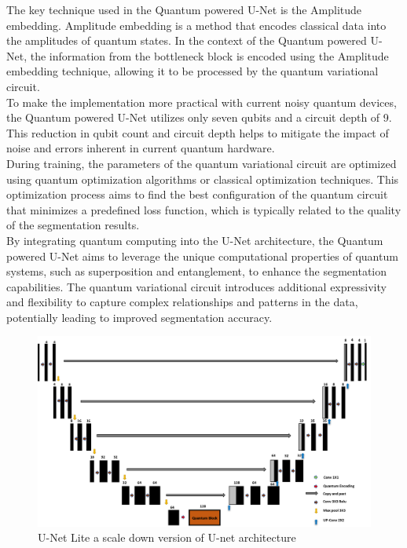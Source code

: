 \documentclass[conference]{IEEEtran}
\begin{document}
The key technique used in the Quantum powered U-Net is the Amplitude embedding. Amplitude embedding is a method that encodes classical data into the amplitudes of quantum states. In the context of the Quantum powered U-Net, the information from the bottleneck block is encoded using the Amplitude embedding technique, allowing it to be processed by the quantum variational circuit.\\

To make the implementation more practical with current noisy quantum devices, the Quantum powered U-Net utilizes only seven qubits and a circuit depth of 9. This reduction in qubit count and circuit depth helps to mitigate the impact of noise and errors inherent in current quantum hardware.\\

During training, the parameters of the quantum variational circuit are optimized using quantum optimization algorithms or classical optimization techniques. This optimization process aims to find the best configuration of the quantum circuit that minimizes a predefined loss function, which is typically related to the quality of the segmentation results.\\

By integrating quantum computing into the U-Net architecture, the Quantum powered U-Net aims to leverage the unique computational properties of quantum systems, such as superposition and entanglement, to enhance the segmentation capabilities. The quantum variational circuit introduces additional expressivity and flexibility to capture complex relationships and patterns in the data, potentially leading to improved segmentation accuracy.\\

\begin{figure}[]

\includegraphics[scale = .3]{Picture2.png}
\caption{U-Net Lite a scale down version of U-net architecture}
\label{fig .2}
\end{figure}
\end{document}
